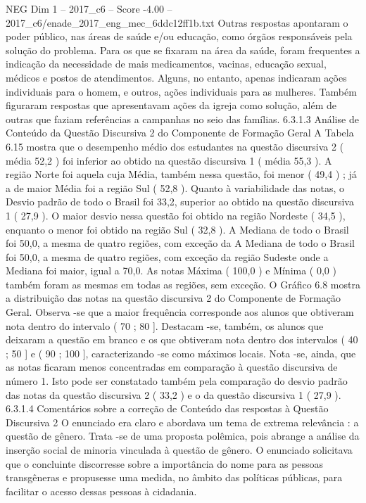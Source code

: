 \begin{textsample}{NEG Dim 1 – 2017\_c6 – Score -4.00 – 2017\_c6/enade\_2017\_eng\_mec\_6ddc12ff1b.txt}
Outras respostas apontaram o poder público, nas áreas de saúde e/ou educação, como órgãos responsáveis pela solução do problema.
Para os que se fixaram na área da saúde, foram frequentes a indicação da necessidade de mais medicamentos, vacinas, educação sexual, médicos e postos de atendimentos.
Alguns, no entanto, apenas indicaram ações individuais para o homem, e outros, ações individuais para as mulheres.
Também figuraram respostas que apresentavam ações da igreja como solução, além de outras que faziam referências a campanhas no seio das famílias. 6.3.1.3 Análise de Conteúdo da Questão Discursiva 2 do Componente de Formação Geral A Tabela 6.15 mostra que o desempenho médio dos estudantes na questão discursiva 2 ( média 52,2 ) foi inferior ao obtido na questão discursiva 1 ( média 55,3 ).
A região Norte foi aquela cuja Média, também nessa questão, foi menor ( 49,4 ) ; já a de maior Média foi a região Sul ( 52,8 ).
Quanto à variabilidade das notas, o Desvio padrão de todo o Brasil foi 33,2, superior ao obtido na questão discursiva 1 ( 27,9 ).
O maior desvio nessa questão foi obtido na região Nordeste ( 34,5 ), enquanto o menor foi obtido na região Sul ( 32,8 ).
A Mediana de todo o Brasil foi 50,0, a mesma de quatro regiões, com exceção da A Mediana de todo o Brasil foi 50,0, a mesma de quatro regiões, com exceção da região Sudeste onde a Mediana foi maior, igual a 70,0.
As notas Máxima ( 100,0 ) e Mínima ( 0,0 ) também foram as mesmas em todas as regiões, sem exceção.
O Gráfico 6.8 mostra a distribuição das notas na questão discursiva 2 do Componente de Formação Geral.
Observa -se que a maior frequência corresponde aos alunos que obtiveram nota dentro do intervalo ( 70 ; 80 ].
Destacam -se, também, os alunos que deixaram a questão em branco e os que obtiveram nota dentro dos intervalos ( 40 ; 50 ] e ( 90 ; 100 ], caracterizando -se como máximos locais.
Nota -se, ainda, que as notas ficaram menos concentradas em comparação à questão discursiva de número 1.
Isto pode ser constatado também pela comparação do desvio padrão das notas da questão discursiva 2 ( 33,2 ) e o da questão discursiva 1 ( 27,9 ). 6.3.1.4 Comentários sobre a correção de Conteúdo das respostas à Questão Discursiva 2 O enunciado era claro e abordava um tema de extrema relevância : a questão de gênero.
Trata -se de uma proposta polêmica, pois abrange a análise da inserção social de minoria vinculada à questão de gênero.
O enunciado solicitava que o concluinte discorresse sobre a importância do nome para as pessoas transgêneras e propusesse uma medida, no âmbito das políticas públicas, para facilitar o acesso dessas pessoas à cidadania.

\end{textsample}
